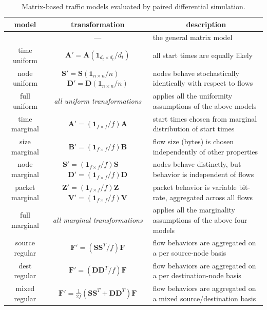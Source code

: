 \documentclass[twocolumn,final]{svjour3}
\newcommand{\caps}[1]{{\smaller{#1}}}
\newcommand{\ones}[1]{\mathbf{1}_{#1}}
\newcommand{\mat}[1]{\mathbf{#1}}
\newcommand{\trans}[1]{{#1}^T}
\begin{document}

\begin{table}
\begin{center}
\small
\begin{tabular}{|c|c|l|}
\multicolumn{1}{c}{\textbf{model}} &
\multicolumn{1}{c}{\textbf{transformation}} &
\multicolumn{1}{c}{\textbf{description}} \\
\hline
\caps{GMM} & --- & the general matrix model \\\hline\hline
time uniform & $\mat{A}'=\mat{A}(\ones{d_t \times d_t}/d_t)$ & all start times are equally likely \\\hline
node uniform & $\mat{S}'=\mat{S}(\ones{n \times n}/n)$~~~~$\mat{D}'=\mat{D}(\ones{n \times n}/n)$ & nodes behave stochastically identically with respect to flows \\\hline
full uniform & \textit{all uniform transformations} & applies all the uniformity assumptions of the above models \\\hline\hline
time marginal & $\mat{A}'=(\ones{f \times f}/f)\mat{A}$ & start times chosen from marginal distribution of start times \\\hline
size marginal & $\mat{B}'=(\ones{f \times f}/f)\mat{B}$ & flow size (bytes) is chosen independently of other properties \\\hline
node marginal & $\mat{S}'=(\ones{f \times f}/f)\mat{S}$~~~~$\mat{D}'=(\ones{f \times f}/f)\mat{D}$ & nodes behave distinctly, but behavior is independent of flows \\\hline
packet marginal & $\mat{Z}'=(\ones{f \times f}/f)\mat{Z}$~~~~$\mat{V}'=(\ones{f \times f}/f)\mat{V}$ & packet behavior is variable bit-rate, aggregated across all flows \\\hline
full marginal & \textit{all marginal transformations} & applies all the marginality assumptions of the above four models \\\hline\hline
source regular & $\mat{F}'=(\trans{\mat{SS}}/f)\mat{F}$ & flow behaviors are aggregated on a per source-node basis \\\hline
dest regular & $\mat{F}'=(\trans{\mat{DD}}/f)\mat{F}$ & flow behaviors are aggregated on a per destination-node basis \\\hline
mixed regular & $\mat{F}'=\frac{1}{2f}(\trans{\mat{SS}}+\trans{\mat{DD}})\mat{F}$ & flow behaviors are aggregated on a mixed source/destination basis \\\hline
\end{tabular}
\caption{Matrix-based traffic models evaluated by paired differential simulation.}
\label{tab:traffic-models}
\end{center}
\vspace{-2em}
\end{table}
\end{document}
